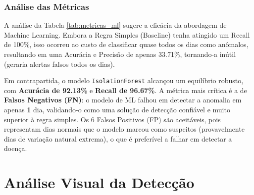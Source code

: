 \begin{table}[htbp]
\centering
\caption{Comparativo de Métricas: Isolation Forest vs. Regra Simples (Baseline).}
\label{tab:metricas_ml}
\caption*{Fonte: Elaborado pelo autor (2025), com dados da execução do script \texttt{detectar\_anomalia.py}.}
\end{table}

\subsubsection{Análise das Métricas}

A análise da Tabela \ref{tab:metricas_ml} sugere a eficácia da abordagem de Machine Learning. Embora a Regra Simples (Baseline) tenha atingido um Recall de 100\%, isso ocorreu ao custo de classificar quase todos os dias como anômalos, resultando em uma Acurácia e Precisão de apenas 33.71\%, tornando-a inútil (geraria alertas falsos todos os dias).

Em contrapartida, o modelo \texttt{IsolationForest} alcançou um equilíbrio robusto, com \textbf{Acurácia de 92.13\%} e \textbf{Recall de 96.67\%}. A métrica mais crítica é a de \textbf{Falsos Negativos (FN)}: o modelo de ML falhou em detectar a anomalia em apenas \textbf{1} dia, validando-o como uma solução de detecção confiável e muito superior à regra simples. Os 6 Falsos Positivos (FP) são aceitáveis, pois representam dias normais que o modelo marcou como suspeitos (provavelmente dias de variação natural extrema), o que é preferível a falhar em detectar a doença.

\section{Análise Visual da Detecção}

